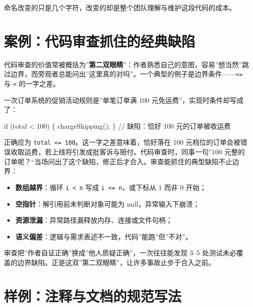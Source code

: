 \documentclass[
]{ctexbook}
\providecommand{\tightlist}{\setlength{\itemsep}{0pt}\setlength{\parskip}{0pt} }
\newenvironment{Shaded}{
  \ttfamily\small
}{}
\newcommand{\NormalTok}[1]{#1}
\begin{document}
命名改变的只是几个字符，改变的却是整个团队理解与维护这段代码的成本。

\section{案例：代码审查抓住的经典缺陷}\label{ux6848ux4f8bux4ee3ux7801ux5ba1ux67e5ux6293ux4f4fux7684ux7ecfux5178ux7f3aux9677}

代码审查的价值常被概括为''\textbf{第二双眼睛}''：作者熟悉自己的意图，容易''想当然''跳过边界，而旁观者总能问出''这里真的对吗''。一个典型的例子是边界条件------\texttt{\textless{}=}
与 \texttt{\textless{}} 的一字之差。

一次订单系统的促销活动规则是''单笔订单满 100
元免运费''，实现时条件却写成了：

\begin{Shaded}
\begin{Highlighting}[]
\NormalTok{if (total \textless{} 100) \{ chargeShipping(); \}   // 缺陷：恰好 100 元的订单被收运费}
\end{Highlighting}
\end{Shaded}

正确应为 \texttt{total\ \textless{}=\ 100}。这一字之差意味着，恰好落在
100
元档位的订单会被错误收取运费，若上线将引发成批客诉与赔付。代码审查时，同事一句''100
元整的订单呢？``当场问出了这个缺陷，修正后才合入。审查能抓住的典型缺陷不止边界：

\begin{itemize}
\tightlist
\item
  \textbf{数组越界}：循环 \texttt{i\ \textless{}\ n} 写成
  \texttt{i\ \textless{}=\ n}，或下标从 1 而非 0 开始；
\item
  \textbf{空指针}：解引用前未判断对象可能为 null，异常输入下崩溃；
\item
  \textbf{资源泄漏}：异常路径漏释放内存、连接或文件句柄；
\item
  \textbf{语义偏差}：逻辑与需求表述不一致，代码''能跑''但''不对''。
\end{itemize}

审查把''作者自证正确''换成''他人质疑正确''，一次往往能发现 3--5
处测试未必覆盖的边界缺陷。正是这双''第二双眼睛''，让许多事故止步于合入之前。

\section{样例：注释与文档的规范写法}\label{ux6837ux4f8bux6ce8ux91caux4e0eux6587ux6863ux7684ux89c4ux8303ux5199ux6cd5}
\end{document}
